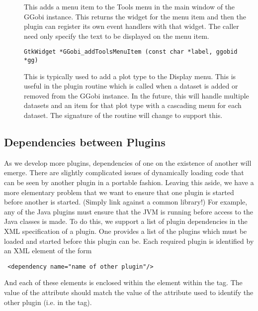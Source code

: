 \documentclass{article}
\begin{document}
\begin{description}
\item[]
This adds a menu item to the Tools menu in the main
window of the GGobi instance.
This returns the widget for the menu item and
then the plugin can register its own event handlers
with that widget.
The caller need only specify the text to be displayed
on the menu item.
\begin{verbatim}
GtkWidget *GGobi_addToolsMenuItem (const char *label, ggobid *gg)
\end{verbatim}

\item[] This is typically used to
add a plot type to the Display menu.  This is useful in the
 plugin routine which is called when a
dataset is added or removed from the GGobi instance.  In the future,
this will handle multiple datasets and an item for that plot type with
a cascading menu for each dataset.  The signature of the routine will
change to support this.
\end{description}


\subsection{Dependencies between Plugins}
As we develop more plugins, dependencies of one on the existence of
another will emerge. There are slightly complicated issues of
dynamically loading code that can be seen by another plugin in a
portable fashion.  Leaving this aside, we have a more elementary
problem that we want to ensure that one plugin is started before
another is started.  (Simply link against a common library!) For
example, any of the Java plugins must ensure that the JVM is running
before access to the Java classes is made.  To do this, we support a
list of plugin dependencies in the XML specification of a plugin.  One
provides a list of the plugins which must be loaded and started before
this plugin can be.  Each required plugin is identified by an XML
element of the form
\begin{verbatim}
 <dependency name="name of other plugin"/>
\end{verbatim}
And each of these elements is enclosed within the
 element within the  tag.  The
value of the  attribute should match the value of
the  attribute used to identify the other plugin
(i.e. in the  tag).
\end{document}
